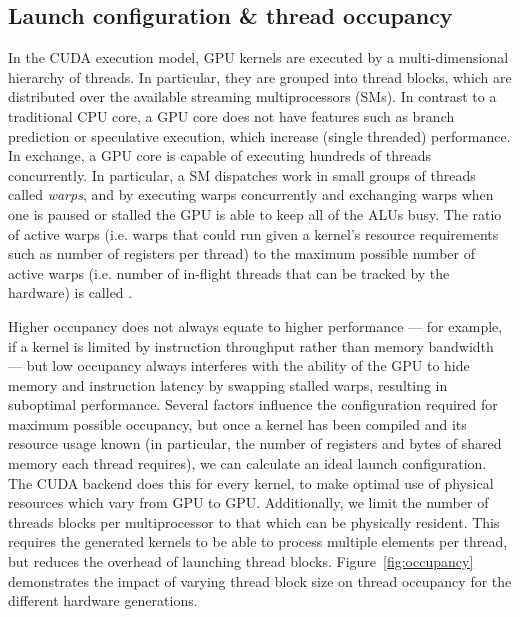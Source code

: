 \subsection{Launch configuration \& thread occupancy}
\label{sec:launch_configuration}
\label{sec:thread_occupancy}

In the CUDA execution model, GPU kernels are executed by a multi-dimensional
hierarchy of threads. In particular, they are grouped into thread blocks, which
are distributed over the available streaming multiprocessors (SMs). In contrast
to a traditional CPU core, a GPU core does not have features such as branch
prediction or speculative execution, which increase (single threaded)
performance. In exchange, a GPU core is capable of executing hundreds of threads
concurrently. In particular, a SM dispatches work in small groups of threads
called \emph{warps}, and by executing warps concurrently and
exchanging warps when one is paused or stalled the GPU is able to keep all of
the ALUs busy. The ratio of active warps (i.e. warps that could run given a
kernel's resource requirements such as number of registers per thread) to the
maximum possible number of active warps (i.e. number of in-flight threads that
can be tracked by the hardware) is called .

Higher occupancy does not always equate to higher performance --- for example,
if a kernel is limited by instruction throughput rather than memory bandwidth
--- but low occupancy always interferes with the ability of the GPU to hide
memory and instruction latency by swapping stalled warps, resulting in
suboptimal performance. Several factors influence the configuration required for
maximum possible occupancy, but once a kernel has been compiled and its resource
usage known (in particular, the number of registers and bytes of shared memory
each thread requires), we can calculate an ideal launch configuration. The CUDA
backend does this for every kernel, to make optimal use of physical resources
which vary from GPU to GPU\@. Additionally, we limit the number of threads blocks
per multiprocessor to that which can be physically resident. This requires the
generated kernels to be able to process multiple elements per thread, but
reduces the overhead of launching thread blocks. Figure~\ref{fig:occupancy}
demonstrates the impact of varying thread block size on thread occupancy for
the different hardware generations.

